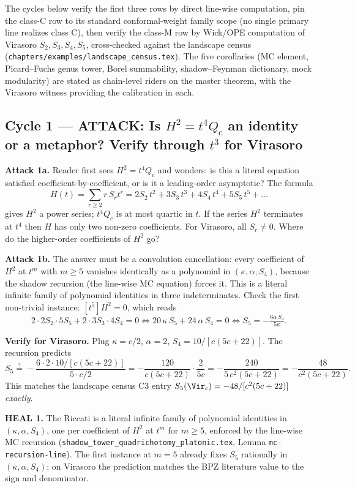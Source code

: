 The cycles below verify the first three rows by direct line-wise
computation, pin the class-C row to its standard conformal-weight
family scope (no single primary line realizes class C), then verify
the class-M row by Wick/OPE computation of Virasoro $S_2, S_3, S_4,
S_5$, cross-checked against the landscape census
(\texttt{chapters/examples/landscape_census.tex}). The five corollaries
(MC element, Picard--Fuchs genus tower, Borel summability,
shadow--Feynman dictionary, mock modularity) are stated as chain-level
riders on the master theorem, with the Virasoro witness providing the
calibration in each.

\subsection*{Cycle 1 --- ATTACK: Is $H^2 = t^4 Q_c$ an identity or a
metaphor? Verify through $t^3$ for Virasoro}

\textbf{Attack 1a.} Reader first sees $H^2 = t^4 Q_c$ and wonders: is
this a literal equation satisfied coefficient-by-coefficient, or is it
a leading-order asymptotic? The formula
\[
  H(t) = \sum_{r\ge 2} r\,S_r t^r
       = 2S_2\,t^2 + 3S_3\,t^3 + 4S_4\,t^4 + 5S_5\,t^5 + \ldots
\]
gives $H^2$ a power series; $t^4 Q_c$ is at most quartic in $t$. If the
series $H^2$ terminates at $t^4$ then $H$ has only two non-zero
coefficients. For Virasoro, all $S_r \ne 0$. Where do the higher-order
coefficients of $H^2$ go?

\textbf{Attack 1b.} The answer must be a convolution cancellation: every
coefficient of $H^2$ at $t^m$ with $m \ge 5$ vanishes identically as a
polynomial in $(\kappa, \alpha, S_4)$, because the shadow recursion
(the line-wise MC equation) forces it. This is a literal infinite
family of polynomial identities in three indeterminates. Check the
first non-trivial instance: $[t^5] H^2 = 0$, which reads
\[
  2\cdot 2S_2 \cdot 5S_5 + 2\cdot 3S_3\cdot 4S_4 = 0
  \iff
  20\,\kappa\,S_5 + 24\,\alpha\,S_4 = 0
  \iff
  S_5 = -\tfrac{6\alpha\,S_4}{5\kappa}.
\]

\textbf{Verify for Virasoro.} Plug $\kappa = c/2$, $\alpha = 2$,
$S_4 = 10/[c(5c+22)]$. The recursion predicts
\[
  S_5 \overset{?}{=} -\frac{6\cdot 2 \cdot 10/[c(5c+22)]}{5\cdot c/2}
     = -\frac{120}{c(5c+22)} \cdot \frac{2}{5c}
     = -\frac{240}{5\,c^2(5c+22)}
     = -\frac{48}{c^2(5c+22)}.
\]
This matches the landscape census C3 entry
$S_5(\Vir_c) = -48/[c^2(5c+22)]$ \emph{exactly}.

\textbf{HEAL 1.} The Riccati is a literal infinite family of polynomial
identities in $(\kappa,\alpha,S_4)$, one per coefficient of $H^2$ at
$t^m$ for $m \ge 5$, enforced by the line-wise MC recursion
(\texttt{shadow\_tower\_quadrichotomy\_platonic.tex}, Lemma
\texttt{mc-recursion-line}). The first instance at $m=5$ already
fixes $S_5$ rationally in $(\kappa,\alpha,S_4)$; on Virasoro the
prediction matches the BPZ literature value to the sign and
denominator.

